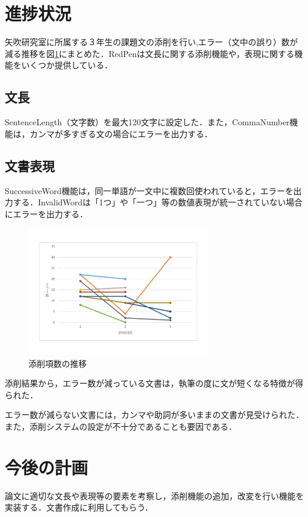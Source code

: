 \documentclass[uplatex,twocolumn,dvipdfmx]{jsarticle}
\begin{document}
\section{進捗状況}
矢吹研究室に所属する３年生の課題文の添削を行い,エラー（文中の誤り）数が減る推移を図\ref{conf}にまとめた．RedPenは文長に関する添削機能や，表現に関する機能をいくつか提供している．

\subsection{文長}
 
SentenceLength（文字数）を最大120文字に設定した．また，CommaNumber機能は，カンマが多すぎる文の場合にエラーを出力する．

\subsection{文書表現}

SuccessiveWord機能は，同一単語が一文中に複数回使われていると，エラーを出力する．InvalidWordは「1つ」や「一つ」等の数値表現が統一されていない場合にエラーを出力する．

\begin{figure}[h]
\centering
\includegraphics[width=8cm,clip]{images.pdf}
\caption{添削項数の推移}\label{conf}
\end{figure}

添削結果から，エラー数が減っている文書は，執筆の度に文が短くなる特徴が得られた．

エラー数が減らない文書には，カンマや助詞が多いままの文書が見受けられた．また，添削システムの設定が不十分であることも要因である．



\section{今後の計画}
論文に適切な文長や表現等の要素を考察し，添削機能の追加，改変を行い機能を実装する．文書作成に利用してもらう．



\end{document}
